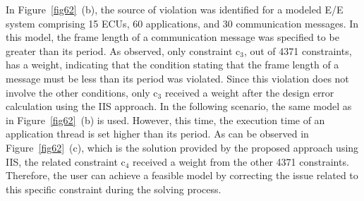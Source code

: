       
    
    
    
 
    In Figure~\ref{fig62}~(b), the source of violation was identified for a modeled E/E system comprising 15 ECUs, 60 applications, and 30 communication messages. In this model, the frame length of a communication message was specified to be greater than its period. As observed, only constraint c$_3$, out of 4371 constraints, has a weight, indicating that the condition stating that the frame length of a message must be less than its period was violated.
    Since this violation does not involve the other conditions, only c$_3$ received a weight after the design error calculation using the IIS approach. In the following scenario, the same model as in Figure~\ref{fig62}~(b) is used. However, this time, the execution time of an application thread is set higher than its period. As can be observed in Figure~\ref{fig62}~(c), which is the solution provided by the proposed approach using IIS, the related constraint c$_4$ received a weight from the other 4371 constraints. Therefore, the user can achieve a feasible model by correcting the issue related to this specific constraint during the solving process.
    

